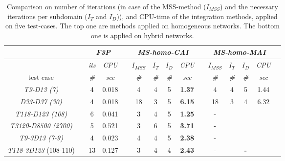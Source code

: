 \begin{table}[h!]
\renewcommand{\arraystretch}{1.3}
\caption{Comparison on number of iterations (in case of the MSS-method ($I_{MSS}$) and the necessary iterations per subdomain ($I_T$ and $I_D$)), and CPU-time of the integration methods, applied on five test-cases. The top one are methods applied on homogeneous networks. The bottom one is applied on hybrid networks. }\label{tab:speed}
\begin{adjustbox}{width=\textwidth} %
\small
\begin{tabular}{@{}l c cc c  cccc c cccc c  @{}}\toprule
                               && \multicolumn{2}{c}{\textit{F3P}} &&     \multicolumn{4}{c}{\textit{MS-homo-CAI}} && \multicolumn{4}{c}{\textit{MS-homo-MAI}} \\ \midrule 
\multicolumn{1}{l}{}        && \textit{its}      & \textit{CPU} && $I_{MSS}$      & $I_T$   &  $I_D$      & \textit{CPU}     &&$I_{MSS}$      & $I_T$   &  $I_D$      & \textit{CPU}      \\
\cmidrule{3-4}  \cmidrule{6-9}  \cmidrule{11-14}   
\multicolumn{1}{c}{test case}      && \textit{\#}       & \textit{sec} && \textit{\#}      & \textit{\#}    & \textit{\#}       & \textit{sec}     && \textit{\#}        & \textit{\#}     &  \textit{\#}       & \textit{sec}  \\
\midrule
\multicolumn{1}{c}{\textit{T9-D13 (7)}}           && 4  & {0.018}    && 4  & 4 & 5 &  \textbf{1.37} && 4  & 4 & 5 & {1.44}\\
\multicolumn{1}{c}{\textit{D33-D37 (30)}}         && 4  & {0.018}    && 18 & 3 & 5 &  \textbf{6.15} && 18  & 3 & 4  & {6.32}\\
\multicolumn{1}{c}{{\textit{T118-D123 (108)}}}    && 6  & {0.041}    && 3  & 4 & 5 &  \textbf{1.25} && -  &  &  &    \\
\multicolumn{1}{c}{{\textit{T3120-D8500 (2700)}}} && 5  & {0.521}    && 3  & 6 & 5 &  \textbf{3.71} && -  &  &  &  \\
\multicolumn{1}{c}{{\textit{T9-3D13 (7-9)}}}      && 4  & {0.023}    && 4  & 4 & 5 &  \textbf{2.38} && -  &  &  &      \\
 \multicolumn{1}{l}{\textit{T118-3D123} (108-110)}          && 13 & {0.127}    && 3  & 4 & 4 &  \textbf{2.43} && -  &  & \textbf{-} \\
\toprule 

\end{tabular}
\end{adjustbox}
\end{table}
